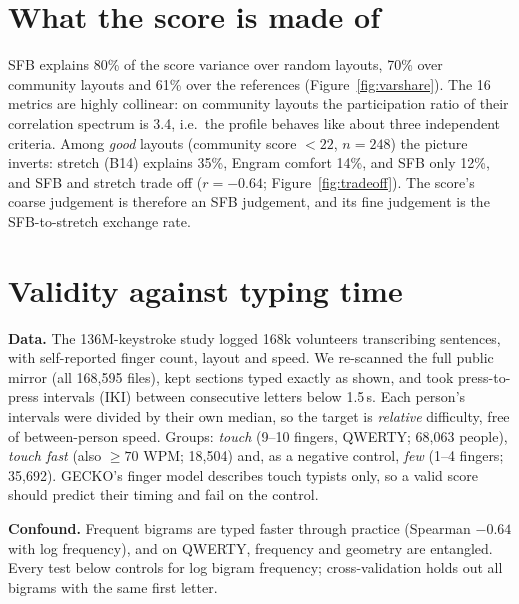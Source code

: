 \documentclass{gecko-paper}
\begin{document}
\begin{paperbody}
\section{What the score is made of}

SFB explains 80\% of the score variance over random layouts, 70\% over community layouts and 61\% over the references (Figure~\ref{fig:varshare}). The 16 metrics are highly collinear: on community layouts the participation ratio of their correlation spectrum is 3.4, i.e.\ the profile behaves like about three independent criteria. Among \emph{good} layouts (community score $<22$, $n=248$) the picture inverts: stretch (B14) explains 35\%, Engram comfort 14\%, and SFB only 12\%, and SFB and stretch trade off ($r=-0.64$; Figure~\ref{fig:tradeoff}). The score's coarse judgement is therefore an SFB judgement, and its fine judgement is the SFB-to-stretch exchange rate.


\section{Validity against typing time}
\textbf{Data.} The 136M-keystroke study  logged 168k volunteers transcribing sentences, with self-reported finger count, layout and speed. We re-scanned the full public mirror (all 168{,}595 files), kept sections typed exactly as shown, and took press-to-press intervals (IKI) between consecutive letters below 1.5\,s. Each person's intervals were divided by their own median, so the target is \emph{relative} difficulty, free of between-person speed. Groups: \emph{touch} (9–10 fingers, QWERTY; 68{,}063 people), \emph{touch fast} (also $\ge 70$ WPM; 18{,}504) and, as a negative control, \emph{few} (1–4 fingers; 35{,}692). GECKO's finger model describes touch typists only, so a valid score should predict their timing and fail on the control.

\textbf{Confound.} Frequent bigrams are typed faster through practice (Spearman $-0.64$ with log frequency), and on QWERTY, frequency and geometry are entangled. Every test below controls for log bigram frequency; cross-validation holds out all bigrams with the same first letter.


\end{paperbody}
\end{document}
